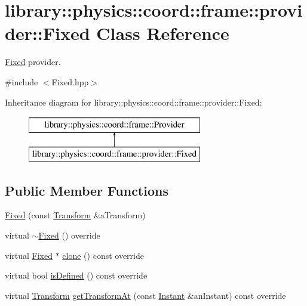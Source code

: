 \hypertarget{classlibrary_1_1physics_1_1coord_1_1frame_1_1provider_1_1_fixed}{}\section{library\+:\+:physics\+:\+:coord\+:\+:frame\+:\+:provider\+:\+:Fixed Class Reference}
\label{classlibrary_1_1physics_1_1coord_1_1frame_1_1provider_1_1_fixed}


\hyperlink{classlibrary_1_1physics_1_1coord_1_1frame_1_1provider_1_1_fixed}{Fixed} provider.  




{\ttfamily \#include $<$Fixed.\+hpp$>$}

Inheritance diagram for library\+:\+:physics\+:\+:coord\+:\+:frame\+:\+:provider\+:\+:Fixed\+:\begin{figure}[H]
\begin{center}
\leavevmode
\includegraphics[height=2.000000cm]{classlibrary_1_1physics_1_1coord_1_1frame_1_1provider_1_1_fixed}
\end{center}
\end{figure}
\subsection*{Public Member Functions}
\begin{DoxyCompactItemize}
\item 
\hyperlink{classlibrary_1_1physics_1_1coord_1_1frame_1_1provider_1_1_fixed_aec9fd108901731b40a12b20f557b09c2}{Fixed} (const \hyperlink{classlibrary_1_1physics_1_1coord_1_1_transform}{Transform} \&a\+Transform)
\item 
virtual \hyperlink{classlibrary_1_1physics_1_1coord_1_1frame_1_1provider_1_1_fixed_ac768956e279bbdbd63bf6b0a19cbfe0e}{$\sim$\+Fixed} () override
\item 
virtual \hyperlink{classlibrary_1_1physics_1_1coord_1_1frame_1_1provider_1_1_fixed}{Fixed} $\ast$ \hyperlink{classlibrary_1_1physics_1_1coord_1_1frame_1_1provider_1_1_fixed_aa042b90216dd5276ffca2054c93dfc6e}{clone} () const override
\item 
virtual bool \hyperlink{classlibrary_1_1physics_1_1coord_1_1frame_1_1provider_1_1_fixed_ac7a58fa0937c28ed0289c1088275c3d2}{is\+Defined} () const override
\item 
virtual \hyperlink{classlibrary_1_1physics_1_1coord_1_1_transform}{Transform} \hyperlink{classlibrary_1_1physics_1_1coord_1_1frame_1_1provider_1_1_fixed_aa5c6299ec0344dbdfb94389b3d7adec5}{get\+Transform\+At} (const \hyperlink{classlibrary_1_1physics_1_1time_1_1_instant}{Instant} \&an\+Instant) const override
\end{DoxyCompactItemize}


